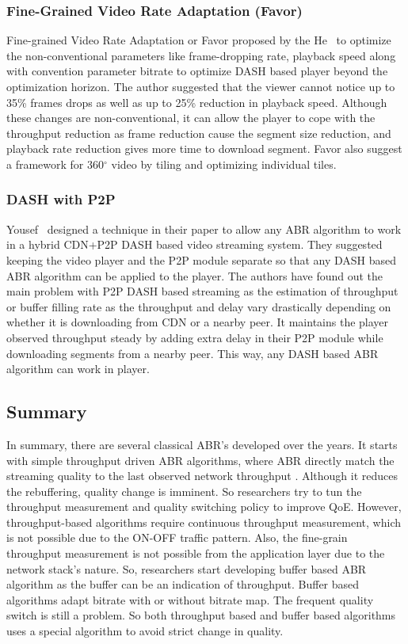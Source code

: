 \subsubsection{Fine-Grained Video Rate Adaptation (Favor)}
Fine-grained Video Rate Adaptation or Favor\cite{10.1145/3204949.3204957} proposed by the He \etal\ to optimize the non-conventional parameters like frame-dropping rate, playback speed along with convention parameter bitrate to optimize DASH based player beyond the optimization horizon. The author suggested that the viewer cannot notice up to 35\% frames drops as well as up to 25\% reduction in playback speed. Although these changes are non-conventional, it can allow the player to cope with the throughput reduction as frame reduction cause the segment size reduction, and playback rate reduction gives more time to download segment. Favor also suggest a framework for 360$^{\circ}$ video by tiling and optimizing individual tiles.

\subsubsection{DASH with P2P}
Yousef \etal\ designed a technique in their paper \cite{10.1145/3339825.3391859} to allow any ABR algorithm to work in a hybrid CDN+P2P DASH based video streaming system. They suggested keeping the video player and the P2P module separate so that any DASH based ABR algorithm can be applied to the player. The authors have found out the main problem with P2P DASH based streaming as the estimation of throughput or buffer filling rate as the throughput and delay vary drastically depending on whether it is downloading from CDN or a nearby peer. It maintains the player observed throughput steady by adding extra delay in their P2P module while downloading segments from a nearby peer. This way, any DASH based ABR algorithm can work in player.

\subsection{Summary}
In summary, there are several classical ABR's developed over the years. It starts with simple throughput driven ABR algorithms, where ABR directly match the streaming quality to the last observed network throughput \cite{5677508,10.1145/1943552.1943575,10.1145/1943552.1943574}. Although it reduces the rebuffering, quality change is imminent. So researchers try to tun the throughput measurement and quality switching policy to improve QoE. However, throughput-based algorithms require continuous throughput measurement, which is not possible due to the ON-OFF traffic pattern. Also, the fine-grain throughput measurement is not possible from the application layer due to the network stack's nature. So, researchers start developing buffer based ABR algorithm as the buffer can be an indication of throughput. Buffer based algorithms adapt bitrate with or without bitrate map. The frequent quality switch is still a problem. So both throughput based and buffer based algorithms uses a special algorithm to avoid strict change in quality.

